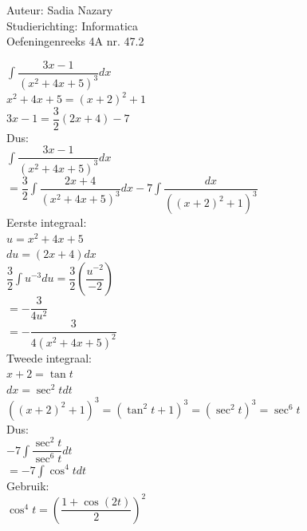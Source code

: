 \documentclass[a4paper]{article}
\newcommand{\dint}{\displaystyle\int}
\begin{document}
\noindent \large Auteur: Sadia Nazary \\
\noindent \large Studierichting: Informatica\\
\noindent \large Oefeningenreeks 4A nr. 47.2\\

\medskip

\normalsize

$\dint\dfrac{3x-1}{(x^2+4x+5)^3}dx$\\

$x^2+4x+5=(x+2)^2+1$\\

$3x-1=\dfrac32(2x+4)-7$\\

Dus:\\

$\dint\dfrac{3x-1}{(x^2+4x+5)^3}dx$\\

$=
\dfrac32\dint\dfrac{2x+4}{(x^2+4x+5)^3}dx
-
7\dint\dfrac{dx}{((x+2)^2+1)^3}$\\

Eerste integraal:\\

$u=x^2+4x+5$\\

$du=(2x+4)dx$\\

$\dfrac32\dint u^{-3}du
=
\dfrac32\left(\dfrac{u^{-2}}{-2}\right)$\\

$=
-\dfrac{3}{4u^2}$\\

$=
-\dfrac{3}{4(x^2+4x+5)^2}$\\

Tweede integraal:\\

$x+2=\tan t$\\

$dx=\sec^2t dt$\\

$((x+2)^2+1)^3=(\tan^2t+1)^3=(\sec^2t)^3=\sec^6t$\\

Dus:\\

$-7\dint\dfrac{\sec^2t}{\sec^6t}dt$\\

$=
-7\dint\cos^4t dt$\\

Gebruik:\\

$\cos^4t=
\left(\dfrac{1+\cos(2t)}2\right)^2$\\
\end{document}
